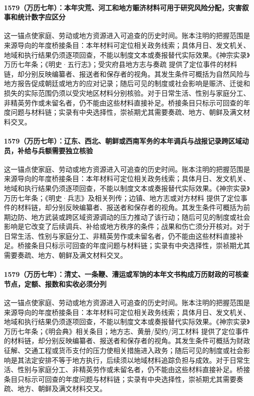 \paragraph{1579（万历七年）：本年灾荒、河工和地方赈济材料可用于研究风险分配，灾害叙事和统计数字应区分} 这一锚点使家庭、劳动或地方资源进入可追查的历史时间。账本注明的把握范围是来源导向的年度桥接条目：本年材料可定位相关政务线索；具体月日、发文机关、地域和执行结果仍须逐项回查，不能以制度文本或奏报替代实际效果。《神宗实录》万历七年条；《明史·五行志》；受灾府县地方志与奏疏 提供了定位事件的材料链，却分别反映编纂者、报送者和保存者的视角。其发生条件可概括为自然风险与地方报告促成朝廷或地方的应对记录；随后可见的制度或社会影响是赈济、迁徙和损失的实际范围仍须以受灾地区材料分别核验。对于日常生活、性别与家庭分工、非精英劳作或未留名者，仍不能由这些材料直接补足。桥接条目只标示可回查的年度问题与材料链；实录有中央选择性，崇祯期尤其需要奏疏、地方、朝鲜及满文材料交叉。

\paragraph{1579（万历七年）：辽东、西北、朝鲜或西南军务的本年调兵与战报记录跨区域动员，补给与兵额需要独立核验} 这一锚点使家庭、劳动或地方资源进入可追查的历史时间。账本注明的把握范围是来源导向的年度桥接条目：本年材料可定位相关政务线索；具体月日、发文机关、地域和执行结果仍须逐项回查，不能以制度文本或奏报替代实际效果。《神宗实录》万历七年条；《明史·兵志》及相关列传；边镇、地方志或对方材料 提供了定位事件的材料链，却分别反映编纂者、报送者和保存者的视角。其发生条件可概括为前期边防、地方武装或跨区域资源调动的压力推动了该行动；随后可见的制度或社会影响是它改变了后续调兵、补给或地方秩序的条件；战果和伤亡须分开核对。对于日常生活、性别与家庭分工、非精英劳作或未留名者，仍不能由这些材料直接补足。桥接条目只标示可回查的年度问题与材料链；实录有中央选择性，崇祯期尤其需要奏疏、地方、朝鲜及满文材料交叉。

\paragraph{1579（万历七年）：清丈、一条鞭、漕运或军饷的本年文书构成万历财政的可核查节点，定额、报数和实收必须分列} 这一锚点使家庭、劳动或地方资源进入可追查的历史时间。账本注明的把握范围是来源导向的年度桥接条目：本年材料可定位相关政务线索；具体月日、发文机关、地域和执行结果仍须逐项回查，不能以制度文本或奏报替代实际效果。《神宗实录》万历七年条；《明会典》相关条目；地方志、黄册/契约/河工材料 提供了定位事件的材料链，却分别反映编纂者、报送者和保存者的视角。其发生条件可概括为财政征解、交通工程或货币支付的压力使相关措施进入政务；随后可见的制度或社会影响是其法定安排不等于地方执行，后续须以地域材料追踪负担与成效。对于日常生活、性别与家庭分工、非精英劳作或未留名者，仍不能由这些材料直接补足。桥接条目只标示可回查的年度问题与材料链；实录有中央选择性，崇祯期尤其需要奏疏、地方、朝鲜及满文材料交叉。


